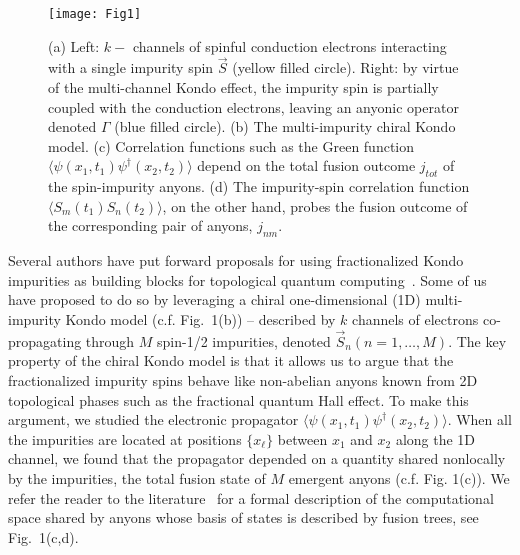 \documentclass[aps,prb,twocolumn,superscriptaddress]{revtex4-1}
\begin{document}
\begin{figure}[h]
	\texttt{[image: Fig1]}
	\caption{(a) Left: $k-$  channels of spinful conduction electrons interacting with a single impurity spin $\vec{S}$ (yellow filled circle). Right: by virtue of the multi-channel Kondo effect, the impurity spin is partially coupled with the conduction electrons, leaving an anyonic operator denoted $\Gamma$ (blue filled circle). (b) The multi-impurity chiral Kondo model. (c) Correlation functions such as the Green function  $\langle \psi(x_1,t_1) \psi^\dagger(x_2,t_2) \rangle$ depend on the total fusion outcome $j_{tot}$ of the spin-impurity anyons. (d) The impurity-spin correlation function $\langle S_{m}(t_1) S_{n}(t_2) \rangle$, on the other hand, probes the fusion outcome of the corresponding pair of anyons, $j_{nm}$.}
	\label{system}
\end{figure}


Several authors have put forward proposals for using  fractionalized Kondo impurities as building blocks for topological quantum computing~\cite{lopes2020anyons,komijani2020isolating}. Some of us have proposed to do so by leveraging a chiral one-dimensional (1D) multi-impurity Kondo model (c.f. Fig.~1(b)) -- described by $k$ channels of electrons co-propagating through $M$ spin-1/2 impurities, denoted $\vec{S}_n (n=1,\dots,M)$. The key property of the chiral Kondo model is that it allows us to argue that the fractionalized impurity spins behave like non-abelian anyons known from 2D topological phases such as the fractional quantum Hall effect. To make this argument, we  studied the electronic propagator $\langle \psi (x_1,t_1) \psi^\dagger (x_2,t_2) \rangle $. When all the impurities are located at positions $\{x_\ell \}$ between $x_1$ and $x_2$ along the 1D channel, we found that the propagator depended on a quantity shared nonlocally  by the impurities, the total fusion state of $M$ emergent anyons (c.f. Fig. 1(c)). We refer the reader to the literature~\cite{nayak2008non,bonderson2008measurement,kitaev2006anyons,bonderson2012non} for a formal description of the computational space shared by anyons whose basis of states is described by fusion trees, see Fig.~1(c,d). 
\end{document}

